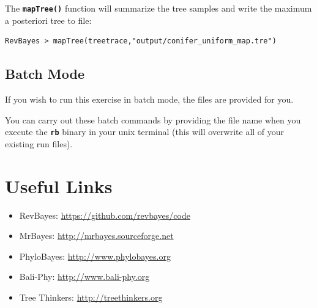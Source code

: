 \documentclass[11pt]{article}
\newcommand{\cl}[1]{{\texttt{\textbf{#1}}}}
\begin{document}
The \cl{mapTree()} function will summarize the tree samples and write the maximum a posteriori tree to file:
{\tt \begin{snugshade*}
\begin{lstlisting}
RevBayes > mapTree(treetrace,"output/conifer_uniform_map.tre")
\end{lstlisting}
\end{snugshade*}}





\bigskip
\subsection*{Batch Mode}

If you wish to run this exercise in batch mode, the files are provided for you. 

You can carry out these batch commands by providing the file name when you execute the \cl{rb} binary in your unix terminal (this will overwrite all of your existing run files).
\exs{\cl{\$ rb full\_analysis.Rev}}

\bigskip
\section*{Useful Links}

\begin{itemize}
\item RevBayes: \href{https://github.com/revbayes/code}{https://github.com/revbayes/code} \\ \vspace{-7mm}
\item MrBayes: \href{http://mrbayes.sourceforge.net/}{http://mrbayes.sourceforge.net} \\ \vspace{-7mm}
\item PhyloBayes: \href{http://megasun.bch.umontreal.ca/People/lartillot/www/index.htm}{http://www.phylobayes.org} \\ \vspace{-7mm}
\item Bali-Phy: \href{http://www.bali-phy.org/}{http://www.bali-phy.org} \\ \vspace{-7mm}
\item Tree Thinkers: \href{http://treethinkers.org/}{http://treethinkers.org} \\ \vspace{-7mm}
\end{itemize}
\end{document}
